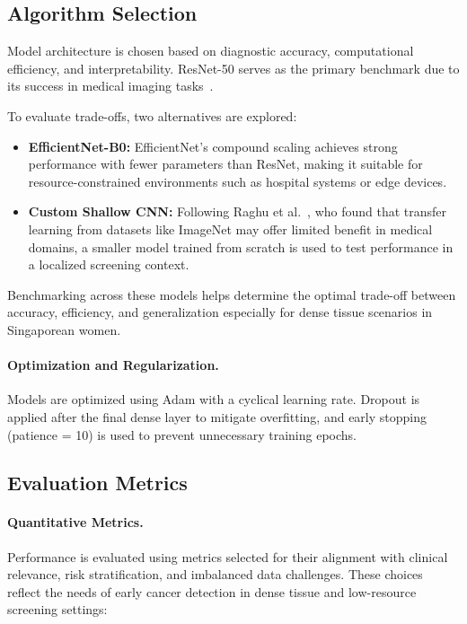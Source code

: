 \documentclass[12pt]{article}
\begin{document}
\subsection{Algorithm Selection}

Model architecture is chosen based on diagnostic accuracy, computational efficiency, and interpretability. ResNet-50 serves as the primary benchmark due to its success in medical imaging tasks~\cite{1,7}. 

To evaluate trade-offs, two alternatives are explored:

\begin{itemize}
    \item \textbf{EfficientNet-B0:} EfficientNet’s compound scaling achieves strong performance with fewer parameters than ResNet, making it suitable for resource-constrained environments such as hospital systems or edge devices.

    \item \textbf{Custom Shallow CNN:} Following Raghu et al.~\cite{2}, who found that transfer learning from datasets like ImageNet may offer limited benefit in medical domains, a smaller model trained from scratch is used to test performance in a localized screening context.
\end{itemize}

Benchmarking across these models helps determine the optimal trade-off between accuracy, efficiency, and generalization especially for dense tissue scenarios in Singaporean women.

\paragraph{Optimization and Regularization.}
Models are optimized using Adam with a cyclical learning rate. Dropout is applied after the final dense layer to mitigate overfitting, and early stopping (patience = 10) is used to prevent unnecessary training epochs.

\vspace{1em}

\subsection{Evaluation Metrics}

\paragraph{Quantitative Metrics.}
Performance is evaluated using metrics selected for their alignment with clinical relevance, risk stratification, and imbalanced data challenges. These choices reflect the needs of early cancer detection in dense tissue and low-resource screening settings:
\end{document}
